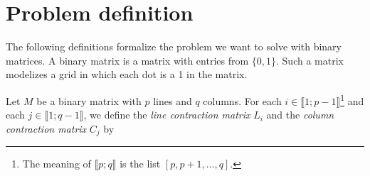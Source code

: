 \section{Problem definition}
\label{sec:problemdef}

The following definitions formalize the problem we want to solve with binary matrices. A binary matrix is a matrix with entries from $\{0,1\}$. Such a matrix modelizes a grid in which each dot is a 1 in the matrix.

\begin{definition}
Let $M$ be a binary matrix with $p$ lines and $q$ columns. For each $i \in \llbracket 1; p-1 \rrbracket$\footnote[1]{The meaning of $\llbracket p; q \rrbracket$ is the list $[p,p+1,\dots, q]$.} and each $j \in \llbracket 1; q-1 \rrbracket$, we define the \emph{line contraction matrix} $L_i$ and the \emph{column contraction matrix} $C_j$ by 
\begin{center}
\end{center}
\end{definition}
